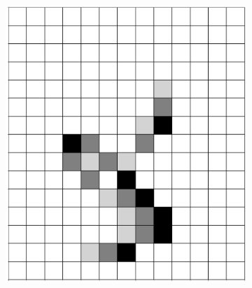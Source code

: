 \documentclass[12pt]{article}
\numberwithin{figure}{section} %
\begin{document}
\begin{figure}[H]
\begin{subfigure}{0.24\textwidth}
     		\subcaption{}
   	\end{subfigure}
    	\begin{subfigure}{0.24\textwidth}
     		\includegraphics[width=\linewidth]{Section4/36.3}
     		\subcaption{}
   	\end{subfigure}
	\newline
	\begin{subfigure}{0.24\textwidth}

\end{subfigure}
\end{figure}
\end{document}
